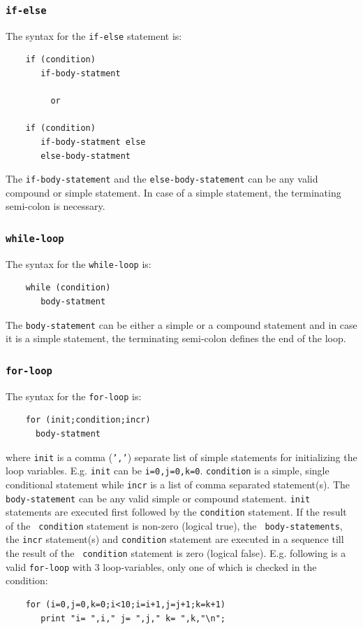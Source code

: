 \documentclass[acmtoms,acmnow]{acmtrans2m}
\begin{document}
\subsubsection{{\tt if-else}}

The syntax for the {\tt if-else} statement is:
\begin{verbatim}
    if (condition)
       if-body-statment
    
         or

    if (condition)
       if-body-statment else
       else-body-statment
\end{verbatim}
The {\tt if-body-statement} and the {\tt else-body-statement} can be
any valid compound or simple statement.  In case of a simple
statement, the terminating semi-colon is necessary.

\subsubsection{{\tt while-loop}}

The syntax for the {\tt while-loop} is:
\begin{verbatim}
    while (condition)
       body-statment
\end{verbatim}
The {\tt body-statement} can be either a simple or a compound
statement and in case it is a simple statement, the terminating
semi-colon defines the end of the loop.

\subsubsection{{\tt for-loop}}

The syntax for the {\tt for-loop} is:
\begin{verbatim}
    for (init;condition;incr)
      body-statment
\end{verbatim}
where {\tt init} is a comma ({\tt ','}) separate list of simple
statements for initializing the loop variables.  E.g. {\tt init} can
be {\tt i=0,j=0,k=0}. {\tt condition} is a simple, single conditional
statement while {\tt incr} is a list of comma separated
statement(s). The {\tt body-statement} can be any valid simple or
compound statement.  {\tt init} statements are executed first followed
by the {\tt condition} statement.  If the result of the {\tt
condition} statement is non-zero (logical true), the {\tt
body-statements}, the {\tt incr} statement(s) and {\tt condition}
statement are executed in a sequence till the result of the {\tt
condition} statement is zero (logical false).  E.g. following is a
valid {\tt for-loop} with 3 loop-variables, only one of which is
checked in the condition:
\begin{verbatim}
    for (i=0,j=0,k=0;i<10;i=i+1,j=j+1;k=k+1) 
       print "i= ",i," j= ",j," k= ",k,"\n";
\end{verbatim}
\end{document}
